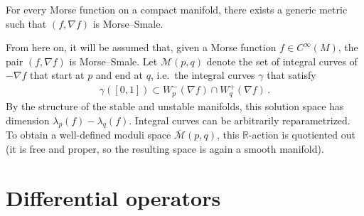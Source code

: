    \begin{property}
        For every Morse function on a compact manifold, there exists a generic metric such that $(f,\nabla f)$ is Morse--Smale.
    \end{property}

    From here on, it will be assumed that, given a Morse function $f\in C^\infty(M)$, the pair $(f,\nabla f)$ is Morse--Smale. Let $\mathcal{M}(p,q)$ denote the set of integral curves of $-\nabla f$ that start at $p$ and end at $q$, i.e.~the integral curves $\gamma$ that satisfy
    \begin{gather}
        \gamma([0,1])\subset W^-_p(\nabla f)\cap W^+_q(\nabla f)\,.
    \end{gather}
    By the structure of the stable and unstable manifolds, this solution space has dimension $\lambda_p(f)-\lambda_q(f)$. Integral curves can be arbitrarily reparametrized. To obtain a well-defined moduli space $\overline{\mathcal{M}}(p,q)$, this $\mathbb{R}$-action is quotiented out (it is free and proper, so the resulting space is again a smooth manifold).


\section{Differential operators}


